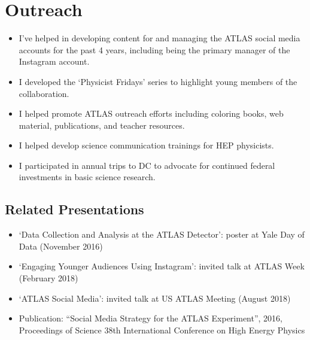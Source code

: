 \section{Outreach}
\begin{itemize}
    \item I've helped in developing content for and managing the ATLAS social media accounts for the past 4 years, including being the primary manager of the Instagram account.
    \item I developed the `Physicist Fridays' series to highlight young members of the collaboration.
    \item I helped promote ATLAS outreach efforts including coloring books, web material, publications, and teacher resources.
    \item I helped develop science communication trainings for HEP physicists. 
    \item I participated in annual trips to DC to advocate for continued federal investments in basic science research. 
\end{itemize}

\subsection{Related Presentations}
\begin{itemize}
    \item ‘Data Collection and Analysis at the ATLAS Detector’: poster at Yale Day of Data (November 2016)
    \item ‘Engaging Younger Audiences Using Instagram’: invited talk at ATLAS Week (February 2018)
    \item ‘ATLAS Social Media’: invited talk at US ATLAS Meeting (August 2018)
    \item Publication: “Social Media Strategy for the ATLAS Experiment”, 2016, Proceedings of Science 38th International Conference on High Energy Physics
\end{itemize}